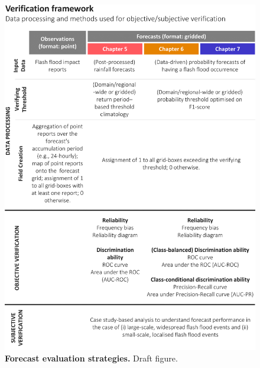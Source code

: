 \begin{figure}[htbp]
\centering
\includegraphics[width=\textwidth]{forecast_evaluation_strategy.png}
\caption{\textbf{Forecast evaluation strategies.} Draft figure.}
\label{fig:forecast_evaluatio_strategy}
\end{figure}

